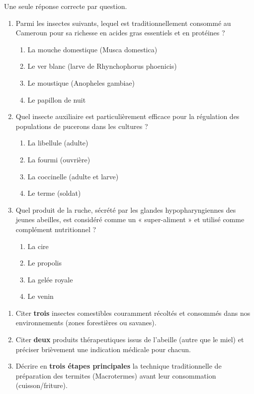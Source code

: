 \documentclass[11pt]{article}
\begin{document}
\begin{exercice}
Une seule réponse correcte par question.
\begin{enumerate}[label=\arabic*.]
\item Parmi les insectes suivants, lequel est traditionnellement consommé au Cameroun pour sa richesse en acides gras essentiels et en protéines ?
\begin{enumerate}
\renewcommand{\labelenumi}{\Alph{enumi}.}
\item La mouche domestique (Musca domestica)
\item Le ver blanc (larve de Rhynchophorus phoenicis)
\item Le moustique (Anopheles gambiae)
\item Le papillon de nuit
\end{enumerate}

\item Quel insecte auxiliaire est particulièrement efficace pour la régulation des populations de pucerons dans les cultures ?
\begin{enumerate}
  \renewcommand{\labelenumi}{\Alph{enumi}.}
  \renewcommand{\theenumi}{\Alph{enumi}}
\item La libellule (adulte)
\item La fourmi (ouvrière)
\item La coccinelle (adulte et larve)
\item Le terme (soldat)
\end{enumerate}

\item Quel produit de la ruche, sécrété par les glandes hypopharyngiennes des jeunes abeilles, est considéré comme un « super-aliment » et utilisé comme complément nutritionnel ?
\begin{enumerate}
  \renewcommand{\labelenumi}{\Alph{enumi}.}
  \item La cire
  \item Le propolis
  \item La gelée royale
  \item Le venin
\end{enumerate}
\end{enumerate}
\end{exercice}

\begin{exercice}
\begin{enumerate}[label=\arabic*.]
\item Citer \textbf{trois} insectes comestibles couramment récoltés et consommés dans nos environnements (zones forestières ou savanes).
\item Citer \textbf{deux} produits thérapeutiques issus de l'abeille (autre que le miel) et préciser brièvement une indication médicale pour chacun.
\item Décrire en \textbf{trois étapes principales} la technique traditionnelle de préparation des termites (Macrotermes) avant leur consommation (cuisson/friture).
\end{enumerate}
\end{exercice}
\end{document}

